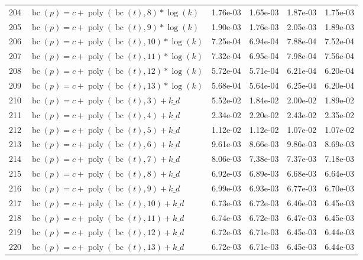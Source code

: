 \documentclass[12pt,a4paper]{article}
\DeclareMathOperator{\bc}{bc}
\DeclareMathOperator{\poly}{poly}
\begin{document}
\begin{longtable}[t]{ll>{\raggedleft\arraybackslash}p{2cm}>{\raggedleft\arraybackslash}p{2cm}>{\raggedleft\arraybackslash}p{2cm}>{\raggedleft\arraybackslash}p{2cm}}
204 & $\bc(p) = c + \poly\left( \bc(t), 8 \right) * \log(k)$ & 1.76e-03 & 1.65e-03 & 1.87e-03 & 1.75e-03\\
\rowcolor{gray!6}  205 & $\bc(p) = c + \poly\left( \bc(t), 9 \right) * \log(k)$ & 1.90e-03 & 1.76e-03 & 2.05e-03 & 1.89e-03\\
206 & $\bc(p) = c + \poly\left( \bc(t), 10 \right) * \log(k)$ & 7.25e-04 & 6.94e-04 & 7.88e-04 & 7.52e-04\\
\rowcolor{gray!6}  207 & $\bc(p) = c + \poly\left( \bc(t), 11 \right) * \log(k)$ & 7.32e-04 & 6.95e-04 & 7.98e-04 & 7.56e-04\\
208 & $\bc(p) = c + \poly\left( \bc(t), 12 \right) * \log(k)$ & 5.72e-04 & 5.71e-04 & 6.21e-04 & 6.20e-04\\
\rowcolor{gray!6}  209 & $\bc(p) = c + \poly\left( \bc(t), 13 \right) * \log(k)$ & 5.68e-04 & 5.64e-04 & 6.25e-04 & 6.20e-04\\
210 & $\bc(p) = c + \poly\left( \bc(t), 3 \right) + k\_d$ & 5.52e-02 & 1.84e-02 & 2.00e-02 & 1.89e-02\\
\rowcolor{gray!6}  211 & $\bc(p) = c + \poly\left( \bc(t), 4 \right) + k\_d$ & 2.34e-02 & 2.20e-02 & 2.43e-02 & 2.35e-02\\
212 & $\bc(p) = c + \poly\left( \bc(t), 5 \right) + k\_d$ & 1.12e-02 & 1.12e-02 & 1.07e-02 & 1.07e-02\\
\rowcolor{gray!6}  213 & $\bc(p) = c + \poly\left( \bc(t), 6 \right) + k\_d$ & 9.61e-03 & 8.66e-03 & 9.86e-03 & 8.69e-03\\
214 & $\bc(p) = c + \poly\left( \bc(t), 7 \right) + k\_d$ & 8.06e-03 & 7.38e-03 & 7.37e-03 & 7.18e-03\\
\rowcolor{gray!6}  215 & $\bc(p) = c + \poly\left( \bc(t), 8 \right) + k\_d$ & 6.92e-03 & 6.89e-03 & 6.68e-03 & 6.64e-03\\
216 & $\bc(p) = c + \poly\left( \bc(t), 9 \right) + k\_d$ & 6.99e-03 & 6.93e-03 & 6.77e-03 & 6.70e-03\\
\rowcolor{gray!6}  217 & $\bc(p) = c + \poly\left( \bc(t), 10 \right) + k\_d$ & 6.73e-03 & 6.72e-03 & 6.46e-03 & 6.45e-03\\
218 & $\bc(p) = c + \poly\left( \bc(t), 11 \right) + k\_d$ & 6.74e-03 & 6.72e-03 & 6.47e-03 & 6.45e-03\\
\rowcolor{gray!6}  219 & $\bc(p) = c + \poly\left( \bc(t), 12 \right) + k\_d$ & 6.72e-03 & 6.71e-03 & 6.45e-03 & 6.44e-03\\
220 & $\bc(p) = c + \poly\left( \bc(t), 13 \right) + k\_d$ & 6.72e-03 & 6.71e-03 & 6.45e-03 & 6.44e-03\\

\end{longtable}
\end{document}
